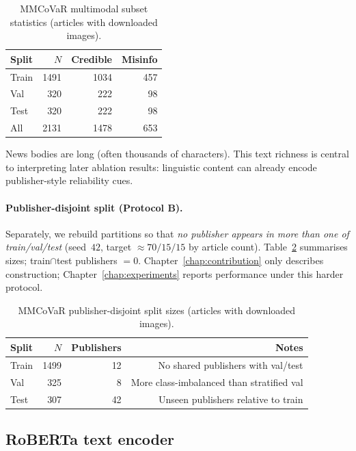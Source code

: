 \documentclass[12pt, a4paper]{report}
\begin{document}
\begin{table}[htbp]
\centering
\caption{MMCoVaR multimodal subset statistics (articles with downloaded images).}
\label{tab:mmcovar-stats}
\begin{tabular}{lrrr}
\hline
Split & $N$ & Credible & Misinfo \\
\hline
Train & 1491 & 1034 & 457 \\
Val   & 320 & 222 & 98 \\
Test  & 320 & 222 & 98 \\
\hline
All   & 2131 & 1478 & 653 \\
\hline
\end{tabular}
\end{table}

News bodies are long (often thousands of characters).
This text richness is central to interpreting later ablation results: linguistic content can already encode publisher-style reliability cues.

\paragraph{Publisher-disjoint split (Protocol B).}
Separately, we rebuild partitions so that \emph{no publisher appears in more than one of train/val/test} (seed~$42$, target $\approx 70/15/15$ by article count).
Table~\ref{tab:mmcovar-pubdisjoint-stats} summarises sizes; train$\cap$test publishers $=0$.
Chapter~\ref{chap:contribution} only describes construction; Chapter~\ref{chap:experiments} reports performance under this harder protocol.

\begin{table}[htbp]
\centering
\caption{MMCoVaR publisher-disjoint split sizes (articles with downloaded images).}
\label{tab:mmcovar-pubdisjoint-stats}
\begin{tabular}{lrrr}
\hline
Split & $N$ & Publishers & Notes \\
\hline
Train & 1499 & 12 & No shared publishers with val/test \\
Val   & 325 & 8 & More class-imbalanced than stratified val \\
Test  & 307 & 42 & Unseen publishers relative to train \\
\hline
\end{tabular}
\end{table}

\subsection{RoBERTa text encoder}
\end{document}
